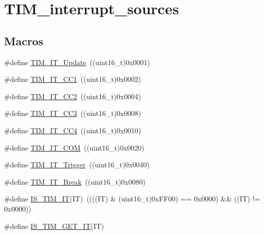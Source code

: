 \hypertarget{group___t_i_m__interrupt__sources}{}\section{T\+I\+M\+\_\+interrupt\+\_\+sources}
\label{group___t_i_m__interrupt__sources}
\subsection*{Macros}
\begin{DoxyCompactItemize}
\item 
\#define \mbox{\hyperlink{group___t_i_m__interrupt__sources_ga8fb63577fec9a3e7c7f5f3eb775ee624}{T\+I\+M\+\_\+\+I\+T\+\_\+\+Update}}~((uint16\+\_\+t)0x0001)
\item 
\#define \mbox{\hyperlink{group___t_i_m__interrupt__sources_ga02267a938ab4722c5013fffa447cf5a6}{T\+I\+M\+\_\+\+I\+T\+\_\+\+C\+C1}}~((uint16\+\_\+t)0x0002)
\item 
\#define \mbox{\hyperlink{group___t_i_m__interrupt__sources_ga60f6b6c424b62ca58d3fafd8f5955e4f}{T\+I\+M\+\_\+\+I\+T\+\_\+\+C\+C2}}~((uint16\+\_\+t)0x0004)
\item 
\#define \mbox{\hyperlink{group___t_i_m__interrupt__sources_ga6aef020aebafd9e585283fbbaf8b841f}{T\+I\+M\+\_\+\+I\+T\+\_\+\+C\+C3}}~((uint16\+\_\+t)0x0008)
\item 
\#define \mbox{\hyperlink{group___t_i_m__interrupt__sources_ga1dce7f1bc32a258f2964cb7c05f413a6}{T\+I\+M\+\_\+\+I\+T\+\_\+\+C\+C4}}~((uint16\+\_\+t)0x0010)
\item 
\#define \mbox{\hyperlink{group___t_i_m__interrupt__sources_gaeb7eff6c39922814e7ee47c0820c3d9f}{T\+I\+M\+\_\+\+I\+T\+\_\+\+C\+OM}}~((uint16\+\_\+t)0x0020)
\item 
\#define \mbox{\hyperlink{group___t_i_m__interrupt__sources_ga339629d21f2490729b28905f5c04bad1}{T\+I\+M\+\_\+\+I\+T\+\_\+\+Trigger}}~((uint16\+\_\+t)0x0040)
\item 
\#define \mbox{\hyperlink{group___t_i_m__interrupt__sources_gad16adab3ac1a4a552a86da069702f24b}{T\+I\+M\+\_\+\+I\+T\+\_\+\+Break}}~((uint16\+\_\+t)0x0080)
\item 
\#define \mbox{\hyperlink{group___t_i_m__interrupt__sources_ga14fce0f8dbe0925e45b415b34bd162c9}{I\+S\+\_\+\+T\+I\+M\+\_\+\+IT}}(IT)~((((IT) \& (uint16\+\_\+t)0x\+F\+F00) == 0x0000) \&\& ((\+I\+T) != 0x0000))
\item 
\#define \mbox{\hyperlink{group___t_i_m__interrupt__sources_ga38e9d740c8d4ed8fcaced73816c124e6}{I\+S\+\_\+\+T\+I\+M\+\_\+\+G\+E\+T\+\_\+\+IT}}(IT)
\end{DoxyCompactItemize}


